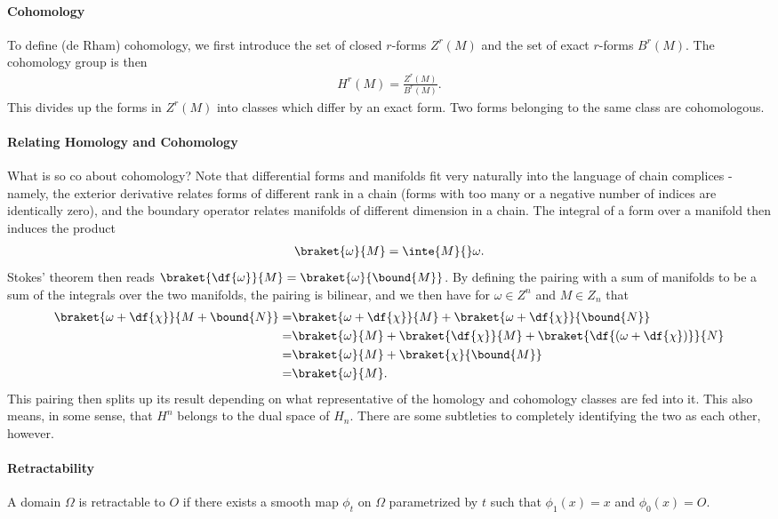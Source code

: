 \paragraph{Cohomology}
To define (de Rham) cohomology, we first introduce the set of closed $r$-forms $Z^{r}(M)$ and the set of exact $r$-forms $B^{r}(M)$. The cohomology group is then
\begin{align*}
	H^{r}(M) = \frac{Z^{r}(M)}{B^{r}(M)}.
\end{align*}
This divides up the forms in $Z^{r}(M)$ into classes which differ by an exact form. Two forms belonging to the same class are cohomologous.

\paragraph{Relating Homology and Cohomology}
What is so co about cohomology? Note that differential forms and manifolds fit very naturally into the language of chain complices - namely, the exterior derivative relates forms of different rank in a chain (forms with too many or a negative number of indices are identically zero), and the boundary operator relates manifolds of different dimension in a chain. The integral of a form over a manifold then induces the product
\begin{align*}
	\braket{\omega}{M} = \inte{M}{}\omega.
\end{align*}
Stokes' theorem then reads $\braket{\df{\omega}}{M} = \braket{\omega}{\bound{M}}$. By defining the pairing with a sum of manifolds to be a sum of the integrals over the two manifolds, the pairing is bilinear, and we then have for $\omega\in Z^{n}$ and $M\in Z_{n}$ that
\begin{align*}
	\braket{\omega + \df{\chi}}{M + \bound{N}} =& \braket{\omega + \df{\chi}}{M} + \braket{\omega + \df{\chi}}{\bound{N}} \\
	=& \braket{\omega}{M} + \braket{\df{\chi}}{M} + \braket{\df{(\omega + \df{\chi})}}{N} \\
	=& \braket{\omega}{M} + \braket{\chi}{\bound{M}} \\
	=& \braket{\omega}{M}.
\end{align*}
This pairing then splits up its result depending on what representative of the homology and cohomology classes are fed into it. This also means, in some sense, that $H^{n}$ belongs to the dual space of $H_{n}$. There are some subtleties to completely identifying the two as each other, however.

\paragraph{Retractability}
A domain $\Omega$ is retractable to $O$ if there exists a smooth map $\phi_{t}$ on $\Omega$ parametrized by $t$ such that $\phi_{1}(x) = x$ and $\phi_{0}(x) = O$.

